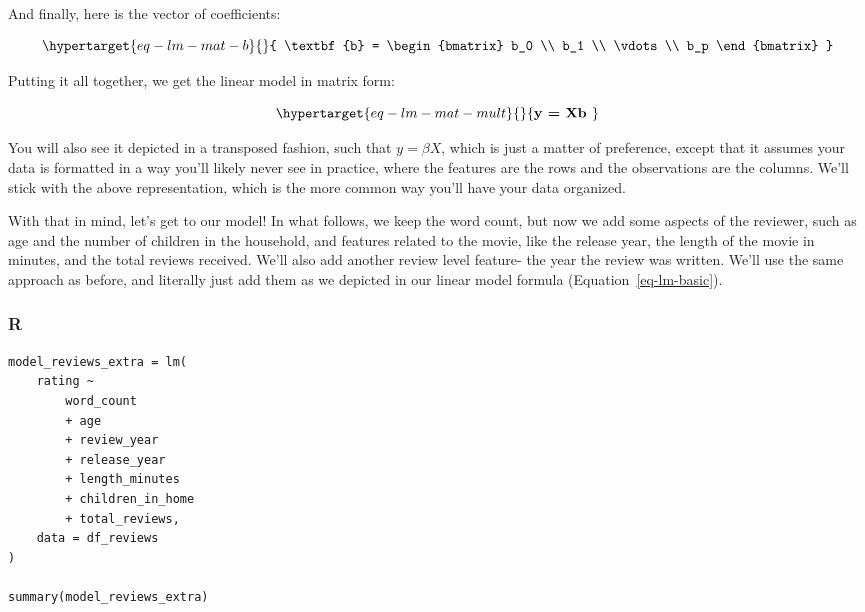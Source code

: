 \documentclass[
  letterpaper,
]{krantz}
\begin{document}
\begin{tcolorbox}[enhanced jigsaw, toprule=.15mm, colback=white, breakable, rightrule=.15mm, arc=.35mm, bottomrule=.15mm, opacityback=0, colframe=quarto-callout-note-color-frame, leftrule=.75mm, left=2mm]
And finally, here is the vector of coefficients:

\begin{equation}\protect\hypertarget{eq-lm-mat-b}{}{
\textbf{b} = \begin{bmatrix}
b_0 \\
b_1 \\
\vdots \\
b_p
\end{bmatrix}
}\label{eq-lm-mat-b}\end{equation}

Putting it all together, we get the linear model in matrix form:

\begin{equation}\protect\hypertarget{eq-lm-mat-mult}{}{
\textbf{y = Xb }
}\label{eq-lm-mat-mult}\end{equation}

You will also see it depicted in a transposed fashion, such that
\(y = \beta X\), which is just a matter of preference, except that it
assumes your data is formatted in a way you'll likely never see in
practice, where the features are the rows and the observations are the
columns. We'll stick with the above representation, which is the more
common way you'll have your data organized.

\end{tcolorbox}

With that in mind, let's get to our model! In what follows, we keep the
word count, but now we add some aspects of the reviewer, such as age and
the number of children in the household, and features related to the
movie, like the release year, the length of the movie in minutes, and
the total reviews received. We'll also add another review level feature-
the year the review was written. We'll use the same approach as before,
and literally just add them as we depicted in our linear model formula
(Equation~\ref{eq-lm-basic}).

\subsubsection{R}

\begin{verbatim}
model_reviews_extra = lm(
    rating ~
        word_count
        + age
        + review_year
        + release_year
        + length_minutes
        + children_in_home
        + total_reviews,
    data = df_reviews
)

summary(model_reviews_extra)
\end{verbatim}
\end{document}

